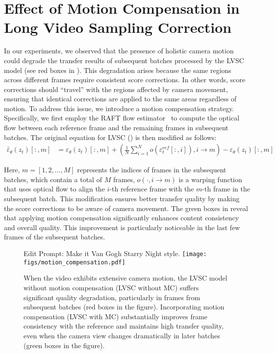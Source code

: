 \section{Effect of Motion Compensation in Long Video Sampling Correction}\label{sec.motion_compensation}
In our experiments, we observed that the presence of holistic camera motion could degrade the transfer results of subsequent batches processed by the LVSC model (see red boxes in ). This degradation arises because the same regions across different frames require consistent score corrections. In other words, score corrections should ``travel'' with the regions affected by camera movement, ensuring that identical corrections are applied to the same areas regardless of motion. To address this issue, we introduce a motion compensation strategy. Specifically, we first employ the RAFT flow estimator~\cite{teed2020raft} to compute the optical flow between each reference frame and the remaining frames in subsequent batches. The original equation for LVSC () is then modified as follows:
\begin{align}
\tilde{\varepsilon_\theta}(z_t)[:, m] &= \varepsilon_\theta(z_t)[:, m] + (\frac{1}{N} \sum_{i=1}^N o(\varepsilon_t^{ref}[:, i]), i \rightarrow m) - \varepsilon_\theta(z_t)[:, m]
\end{align}

Here, $m=[1, 2, ..., M]$ represents the indices of frames in the subsequent batches, which contain a total of $M$ frames, $o(\cdot, i \rightarrow m)$ is a warping function that uses optical flow to align the $i$-th reference frame with the $m$-th frame in the subsequent batch. This modification ensures better transfer quality by making the score corrections to be aware of camera movement. The green boxes in  reveal that applying motion compensation significantly enhances content consistency and overall quality. This improvement is particularly noticeable in the last few frames of the subsequent batches.

\begin{figure}
    \centering
    Edit Prompt: Make it Van Gogh Starry Night style.
    \texttt{[image: figs/motion\_compensation.pdf]}
    \caption{When the video exhibits extensive camera motion, the LVSC model without motion compensation (LVSC without MC) suffers significant quality degradation, particularly in frames from subsequent batches (red boxes in the figure). Incorporating motion compensation (LVSC with MC) substantially improves frame consistency with the reference and maintains high transfer quality, even when the camera view changes dramatically in later batches (green boxes in the figure). }
    \label{fig.motion_compensation}
\end{figure}

